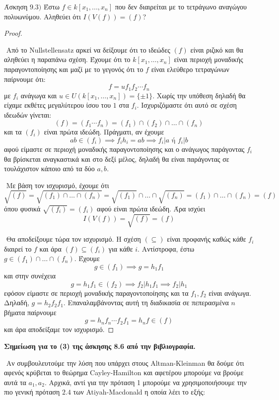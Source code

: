 \documentclass[oneside,a4paper]{article}
\newcommand {\tl}{\textlatin}
\begin{document}
\noindent Άσκηση $9.3)$ Έστω $f \in k[x_1,...,x_n]$ που δεν διαιρείται με το τετράγωνο αναγώγου πολυωνύμου. Αληθεύει ότι $I(V(f))=(f)$?

\vspace*{1cm}
\begin{proof} $ $

	$ $\newline
	Από το \tl{Nullstellensatz} αρκεί να δείξουμε ότι το ιδεώδες $(f)$ είναι ριζικό και θα αληθεύει η παραπάνω σχέση. Έχουμε ότι το $k[x_1,\ldots,x_n]$ είναι περιοχή μοναδικής παραγοντοποίησης και μαζί με το γεγονός ότι το $f$ είναι ελεύθερο τετραγώνων παίρνουμε ότι:
	$$f = u f_1 f_2 \cdots f_n$$ με $f_i$ ανάγωγα και $u \in U(k[x_1,\ldots,x_n]) = \{\pm 1\}$. Χωρίς την υπόθεση δηλαδή θα είχαμε εκθέτες μεγαλύτερου ίσου του $1$ στα $f_i$. Ισχυριζόμαστε ότι αυτό σε σχέση ιδεωδών γίνεται: 
	$$(f) = (f_1 \cdots f_n) = (f_1)\cap (f_2) \cap \ldots \cap (f_n)$$ και τα $(f_i)$ είναι πρώτα ιδεώδη. Πράγματι, αν έχουμε $$ab \in (f_i) \implies f_i h_i = ab \implies f_i| a \text{ ή } f_i|b $$ αφού είμαστε σε περιοχή μοναδικής παραγοντοποίησης και ο ανάγωγος παράγοντας $f_i$ θα βρίσκεται αναγκαστικά και στο δεξί μέλος, δηλαδή θα είναι παράγοντας σε τουλάχιστον κάποιο από τα δύο $a,b$.

	$ $\newline
	Με βάση τον ισχυρισμό, έχουμε ότι
	$$\sqrt{(f)} = \sqrt{(f_1)\cap \ldots \cap (f_n)} = \sqrt{(f_1)}\cap \ldots \cap \sqrt{(f_n)} = (f_1)\cap\ldots\cap (f_n) = (f)$$ όπου φυσικά $\sqrt{(f_i)} = (f_i)$ αφού είναι πρώτα ιδεώδη. Άρα ισχύει $$I(V(f)) = \sqrt{(f)} = (f)$$

	$ $\newline
	Θα αποδείξουμε τώρα τον ισχυρισμό. Η σχέση $(\subseteq)$ είναι προφανής καθώς κάθε $f_i$ διαιρεί το $f$ και άρα $(f) \subseteq (f_i)$ για κάθε $i$. Αντίστροφα, έστω $g \in (f_1)\cap\ldots\cap (f_n)$. Έχουμε $$g \in (f_1) \implies g = h_1 f_1$$ και στην συνέχεια $$g = h_1 f_1 \in (f_2) \implies f_2 | h_1 f_1 \implies f_2 | h_1 $$ εφόσον είμαστε σε περιοχή μοναδικής παραγοντοποίησης και τα $f_1,f_2$ είναι ανάγωγα. Δηλαδή, $g = h_2 f_2 f_1$. Επαναλαμβάνοντας αυτή τη διαδικασία σε πεπερασμένα $n$ βήματα παίρνουμε $$g = h_n f_n \cdots f_2 f_1 = h_n f \in (f)$$ και άρα αποδείξαμε τον ισχυρισμό. 
\end{proof}

\pagebreak
\noindent \textbf{Σημείωση για το (3) της άσκησης 8.6 από την βιβλιογραφία.}

$ $\newline
Αν συμβουλευτούμε την λύση που υπάρχει στους \tl{Altman-Kleinman} θα δούμε ότι αφενός κρύβεται το θεώρημα \tl{Cayley-Hamilton} και αφετέρου μπορούμε να βρούμε αυτά τα $a_1,a_2$. Αρχικά, αντί για την πρόταση 1 μπορούμε να χρησιμοποιήσουμε την πιο γενική πρόταση $2.4$ των \tl{Atiyah-Macdonald} η οποία λέει το εξής:
\end{document}
